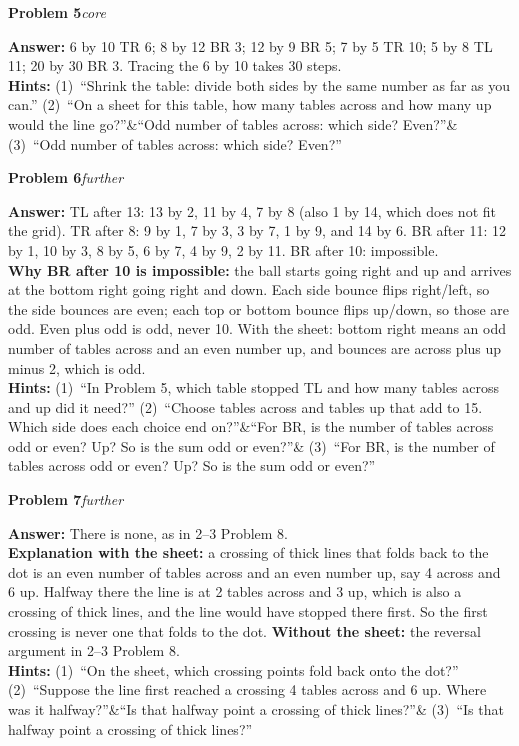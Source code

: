 \documentclass[11pt,letterpaper]{article}
\newcommand{\prob}[3]{\needspace{3\baselineskip}\par\smallskip\textbf{#1}\enspace\textit{#2}\enspace{\small(#3)}\par}
\newcommand{\ans}{\textbf{Answer:} }
\newcommand{\hints}[3]{\textbf{Hints:} (1)~#1 (2)~#2\ifx&#3&\else{} (3)~#3\fi\par}
\newcommand{\core}{core}
\newcommand{\further}{further}
\begin{document}
\prob{Problem 5}{\core}{page 6}
\ans 6 by 10 TR 6; 8 by 12 BR 3; 12 by 9 BR 5; 7 by 5 TR 10; 5 by 8 TL 11; 20 by 30 BR 3. Tracing the 6 by 10 takes 30 steps.\\
\hints{``Shrink the table: divide both sides by the same number as far as you can.''}{``On a sheet for this table, how many tables across and how many up would the line go?''}{``Odd number of tables across: which side? Even?''}

\prob{Problem 6}{\further}{page 7, grid 14 by 12}
\ans TL after 13: 13 by 2, 11 by 4, 7 by 8 (also 1 by 14, which does not fit the grid). TR after 8: 9 by 1, 7 by 3, 3 by 7, 1 by 9, and 14 by 6. BR after 11: 12 by 1, 10 by 3, 8 by 5, 6 by 7, 4 by 9, 2 by 11. BR after 10: impossible.\\
\textbf{Why BR after 10 is impossible:} the ball starts going right and up and arrives at the bottom right going right and down. Each side bounce flips right/left, so the side bounces are even; each top or bottom bounce flips up/down, so those are odd. Even plus odd is odd, never 10. With the sheet: bottom right means an odd number of tables across and an even number up, and bounces are across plus up minus 2, which is odd.\\
\hints{``In Problem 5, which table stopped TL and how many tables across and up did it need?''}{``Choose tables across and tables up that add to 15. Which side does each choice end on?''}{``For BR, is the number of tables across odd or even? Up? So is the sum odd or even?''}

\prob{Problem 7}{\further}{page 8}
\ans There is none, as in 2--3 Problem 8.\\
\textbf{Explanation with the sheet:} a crossing of thick lines that folds back to the dot is an even number of tables across and an even number up, say 4 across and 6 up. Halfway there the line is at 2 tables across and 3 up, which is also a crossing of thick lines, and the line would have stopped there first. So the first crossing is never one that folds to the dot. \textbf{Without the sheet:} the reversal argument in 2--3 Problem 8.\\
\hints{``On the sheet, which crossing points fold back onto the dot?''}{``Suppose the line first reached a crossing 4 tables across and 6 up. Where was it halfway?''}{``Is that halfway point a crossing of thick lines?''}
\end{document}
